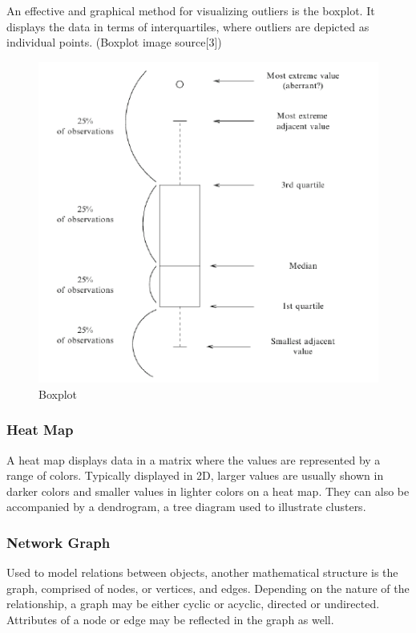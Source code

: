 \documentclass[12pt,]{article}
\begin{document}
An effective and graphical method for visualizing outliers is the
boxplot. It displays the data in terms of interquartiles, where outliers
are depicted as individual points. (Boxplot image source{[}3{]})

\begin{figure}

{\centering \includegraphics{thesis_files/figure-latex/unnamed-chunk-14-1} 

}

\caption{Boxplot}\label{fig:unnamed-chunk-14}
\end{figure}

\subsubsection{Heat Map}\label{heat-map}

A heat map displays data in a matrix where the values are represented by
a range of colors. Typically displayed in 2D, larger values are usually
shown in darker colors and smaller values in lighter colors on a heat
map. They can also be accompanied by a dendrogram, a tree diagram used
to illustrate clusters.

\subsubsection{Network Graph}\label{network-graph}

Used to model relations between objects, another mathematical structure
is the graph, comprised of nodes, or vertices, and edges. Depending on
the nature of the relationship, a graph may be either cyclic or acyclic,
directed or undirected. Attributes of a node or edge may be reflected in
the graph as well.
\end{document}
